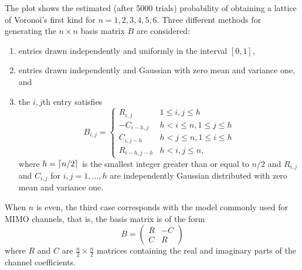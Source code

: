 \documentclass[a4paper,10pt]{article}
\begin{document}



The plot shows the estimated (after 5000 trials) probability of obtaining a lattice of Voronoi's first kind for $n=1,2,3,4,5,6$.  Three different methods for generating the $n \times n$ basis matrix $B$ are considered: 
\begin{enumerate}
\item entries drawn independently and uniformly in the interval $[0,1]$, 
\item entries drawn independently and Gaussian with zero mean and variance one, and 
\item the $i,j$th entry satisfies
\[
B_{i,j} = \begin{cases}
R_{i,j} & 1 \leq i,j \leq h \\
-C_{i-h,j} & h < i \leq n, 1 \leq j \leq h \\
C_{i,j-h} & h < j \leq n, 1 \leq i \leq h \\
R_{i-h,j-h} & h < i,j \leq n,
\end{cases}
\] 
where $h = \lceil n/2 \rceil$ is the smallest integer greater than or equal to $n/2$ and $R_{i,j}$ and $C_{i,j}$ for $i,j = 1,\dots,h$ are independently Gaussian distributed with zero mean and variance one. 
\end{enumerate}
When $n$ is even, the third case corresponds with the model commonly used for MIMO channels, that is, the basis matrix is of the form
\[
B = \left(\begin{array}{cc}
R & -C \\
C & R
\end{array}\right)
\]
where $R$ and $C$ are $\tfrac{n}{2} \times \tfrac{n}{2}$ matrices containing the real and imaginary parts of the channel coefficients.
\end{document}
